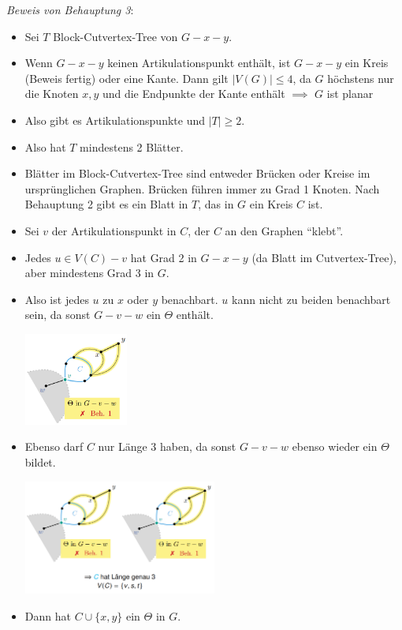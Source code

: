 \textit{Beweis von Behauptung 3}:
\begin{itemize}
	\item Sei $T$ Block-Cutvertex-Tree von $G-x-y$.
	\item Wenn $G-x-y$ keinen Artikulationspunkt enthält, ist $G-x-y$ ein Kreis (Beweis fertig)  oder eine Kante. Dann gilt $|V(G)|\leq 4$, da $G$ höchstens nur die Knoten $x,y$ und die Endpunkte der Kante enthält
	$\implies$ $G$ ist planar \Lightning
	\item Also gibt es Artikulationspunkte und $|T|\geq 2$.
	\item Also hat $T$ mindestens 2 Blätter.
	\item Blätter im Block-Cutvertex-Tree sind entweder Brücken oder Kreise im ursprünglichen Graphen. Brücken führen immer zu Grad 1 Knoten. Nach Behauptung 2 gibt es ein Blatt in $T$, das in $G$ ein Kreis $C$ ist.
	\item Sei $v$ der Artikulationspunkt in $C$, der $C$ an den Graphen \enquote{klebt}.
	\item Jedes $u\in V(C)-v$ hat Grad 2 in $G-x-y$ (da Blatt im Cutvertex-Tree), aber mindestens Grad 3 in $G$.
	\item Also ist jedes $u$ zu $x$ oder $y$ benachbart. $u$ kann nicht zu beiden benachbart sein, da sonst $G-v-w$ ein $\Theta$ enthält.
	\begin{center}
		\includegraphics[width=0.27\textwidth]{images/wagner-9.png}
	\end{center}
	\item Ebenso darf $C$ nur Länge 3 haben, da sonst $G-v-w$ ebenso wieder ein $\Theta$ bildet.
	\begin{center}
		\includegraphics[width=0.5\textwidth]{images/wagner-10.png}
	\end{center}
	\item Dann hat $C\cup\{x,y\}$ ein $\Theta$ in $G$.

\end{itemize}
